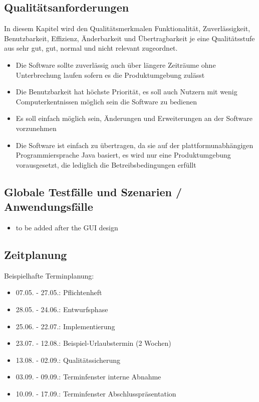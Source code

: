 \documentclass[12 pt]{article}
\begin{document}
\subsection{Qualitätsanforderungen}
In diesem Kapitel wird den Qualitätsmerkmalen Funktionalität, Zuverlässigkeit, Benutzbarkeit, Effizienz, Änderbarkeit und Übertragbarkeit je eine Qualitätsstufe aus sehr gut, gut, normal und nicht relevant zugeordnet.
\begin{itemize}
\item Die Software sollte zuverlässig auch über längere Zeiträume ohne Unterbrechung laufen sofern es die Produktumgebung zulässt
\item Die Benutzbarkeit hat höchste Priorität, es soll auch Nutzern mit wenig Computerkentnissen möglich sein die Software zu bedienen
\item Es soll einfach möglich sein, Änderungen und Erweiterungen an der Software vorzunehmen
\item Die Software ist einfach zu übertragen, da sie auf der plattformunabhängigen Programmiersprache Java basiert, es wird nur eine Produktumgebung vorausgesetzt, die lediglich die Betreibsbedingungen erfüllt
\end{itemize}


\subsection{Globale Testfälle und Szenarien / Anwendungsfälle}
\begin{itemize}
\item to be added after the GUI design
\end{itemize}


\subsection{Zeitplanung}
Beispielhafte Terminplanung: \\
\begin{itemize}
	\item 07.05. - 27.05.: Pflichtenheft
	\item 28.05. - 24.06.: Entwurfsphase
	\item 25.06. - 22.07.: Implementierung
	\item 23.07. - 12.08.: Beispiel-Urlaubstermin (2 Wochen)
	\item 13.08. - 02.09.: Qualitätssicherung
	\item 03.09. - 09.09.: Terminfenster interne Abnahme
	\item 10.09. - 17.09.: Terminfenster Abschlusspräsentation
\end{itemize}
\end{document}
